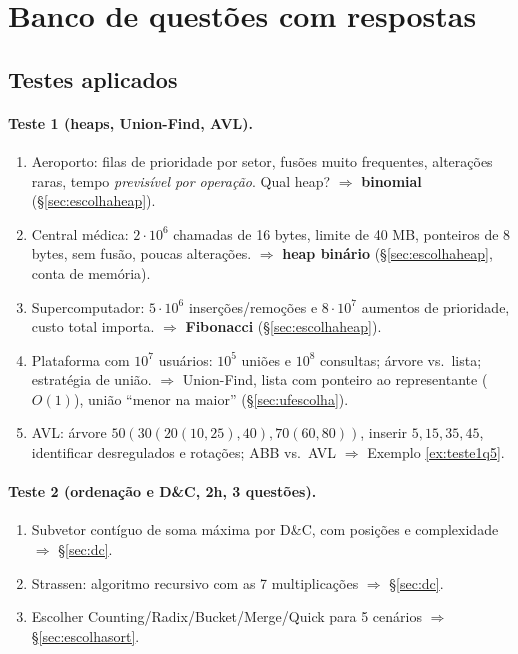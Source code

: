 \section{Banco de questões com respostas}\label{sec:banco}

\subsection{Testes aplicados}\label{sec:testes}
\paragraph{Teste 1 (heaps, Union-Find, AVL).}
\begin{enumerate}
  \item Aeroporto: filas de prioridade por setor, fusões muito frequentes, alterações raras, tempo \emph{previsível por operação}. Qual heap? $\Rightarrow$ \textbf{binomial} (§\ref{sec:escolhaheap}).
  \item Central médica: $2\cdot10^6$ chamadas de 16 bytes, limite de 40 MB, ponteiros de 8 bytes, sem fusão, poucas alterações. $\Rightarrow$ \textbf{heap binário} (§\ref{sec:escolhaheap}, conta de memória).
  \item Supercomputador: $5\cdot10^6$ inserções/remoções e $8\cdot10^7$ aumentos de prioridade, custo total importa. $\Rightarrow$ \textbf{Fibonacci} (§\ref{sec:escolhaheap}).
  \item Plataforma com $10^7$ usuários: $10^5$ uniões e $10^8$ consultas; árvore vs.\ lista; estratégia de união. $\Rightarrow$ Union-Find, lista com ponteiro ao representante (\Find{} $O(1)$), união ``menor na maior'' (§\ref{sec:ufescolha}).
  \item AVL: árvore $50(30(20(10,25),40),70(60,80))$, inserir $5,15,35,45$, identificar desregulados e rotações; ABB vs.\ AVL $\Rightarrow$ Exemplo \ref{ex:teste1q5}.
\end{enumerate}
\paragraph{Teste 2 (ordenação e D\&C, 2h, 3 questões).}
\begin{enumerate}
  \item Subvetor contíguo de soma máxima por D\&C, com posições e complexidade $\Rightarrow$ §\ref{sec:dc}.
  \item Strassen: algoritmo recursivo com as 7 multiplicações $\Rightarrow$ §\ref{sec:dc}.
  \item Escolher Counting/Radix/Bucket/Merge/Quick para 5 cenários $\Rightarrow$ §\ref{sec:escolhasort}.
\end{enumerate}

